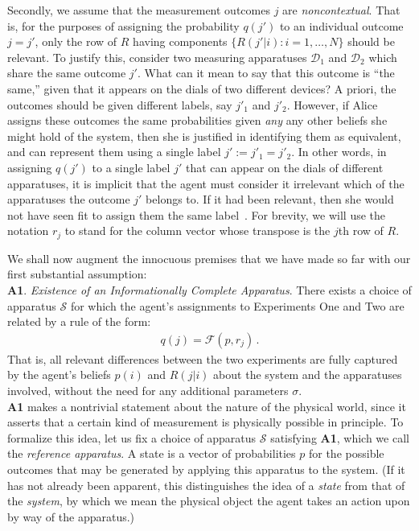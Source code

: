 \documentclass[%
 reprint,superscriptaddress,
 amsmath,amssymb,
 aps,twocolumn,pra
]{revtex4-1}
\newcommand{\eqn}[1]{\begin{eqnarray} #1 \end{eqnarray}}
\newcommand{\tit}[1]{\textit{#1}}
\newcommand{\onestage}{{One}}
\newcommand{\twostage}{{Two}}
\begin{document}
Secondly, we assume that the measurement outcomes $j$ are \tit{noncontextual}. That is, for the purposes of assigning the probability $q(j')$ to an individual outcome $j=j'$, only the row of $R$ having components $\{R(j'|i):i=1,\dots,N \}$ should be relevant. To justify this, consider two measuring apparatuses $\mathcal{D}_1$ and $\mathcal{D}_2$ which share the same outcome $j'$. What can it mean to say that this outcome is ``the same,'' given that it appears on the dials of two different devices? A priori, the outcomes should be given different labels, say $j'_1$ and $j'_2$. However, if Alice assigns these outcomes the same probabilities given \tit{any} any other beliefs she might hold of the system, then she is justified in identifying them as equivalent, and can represent them using a single label $j' := j'_1 = j'_2$. In other words, in assigning $q(j')$ to a single label $j'$ that can appear on the dials of different apparatuses, it is implicit that the agent must consider it irrelevant which of the apparatuses the outcome $j'$ belongs to. If it had been relevant, then she would not have seen fit to assign them the same label~\cite{Fuchs02a}. For brevity, we will use the notation $r_j$ to stand for the column vector whose transpose is the $j$th row of $R$.

We shall now augment the innocuous premises that we have made so far with our first substantial assumption:\\

{\bf A1}. \tit{Existence of an Informationally Complete Apparatus}. There exists a choice of apparatus $\mathcal{S}$ for which the agent's assignments to Experiments \onestage{} and \twostage{} are related by a rule of the form:
\eqn{ \label{eqn:nosigma}
q(j) = \mathcal{F}( p, r_j) \, .
}
That is, all relevant differences between the two experiments are fully captured by the agent's beliefs $p(i)$ and $R(j|i)$ about the system and the apparatuses involved, without the need for any additional parameters $\sigma$.\\

{\bf A1} makes a nontrivial statement about the nature of the physical world, since it asserts that a certain kind of measurement is physically possible in principle. To formalize this idea, let us fix a choice of apparatus $\mathcal{S}$ satisfying {\bf A1}, which we call the \tit{reference apparatus}. A state is a vector of probabilities $p$ for the possible outcomes that may be generated by applying this apparatus to the system. (If it has not already been apparent, this distinguishes the idea of a \tit{state} from that of the \tit{system}, by which we mean the physical object the agent takes an action upon by way of the apparatus.)
\end{document}
